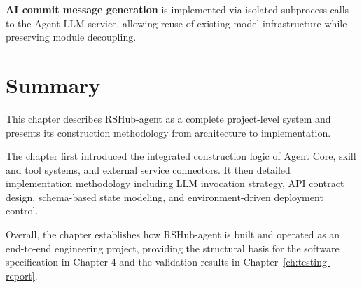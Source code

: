 \textbf{AI commit message generation} is implemented via isolated subprocess calls to the Agent LLM service, allowing reuse of existing model infrastructure while preserving module decoupling.

\section{Summary}

This chapter describes RSHub-agent as a complete project-level system and presents its construction methodology from architecture to implementation.

The chapter first introduced the integrated construction logic of Agent Core, skill and tool systems, and external service connectors. It then detailed implementation methodology including LLM invocation strategy, API contract design, schema-based state modeling, and environment-driven deployment control.

Overall, the chapter establishes how RSHub-agent is built and operated as an end-to-end engineering project, providing the structural basis for the software specification in Chapter 4 and the validation results in Chapter~\ref{ch:testing-report}.

